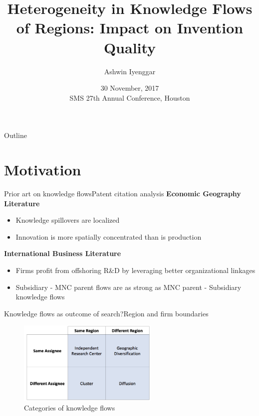 \documentclass{beamer}
\title{Heterogeneity in Knowledge Flows of Regions: Impact on Invention Quality}
\author{Ashwin Iyenggar}
\institute[Indian Institute of Management Bangalore] 
{
  Doctoral Student, Strategy Area\\
  Indian Institute of Management Bangalore
}
\date{30 November, 2017 \\ SMS 27th Annual Conference, Houston}
\begin{document}
\begin{frame}
  \titlepage
\end{frame}

\begin{frame}{Outline}
  \tableofcontents
\end{frame}


\section{Motivation}

\begin{frame}{Prior art on knowledge flows}{Patent citation analysis}
\textbf{Economic Geography Literature}
\begin{itemize}
\item{Knowledge spillovers are localized \citep*{Jaffe1993}}
\item{Innovation is more spatially concentrated than is production \citep{Feldman1994a}}
\end{itemize}

\textbf{International Business Literature}
\begin{itemize}
\item{Firms profit from offshoring R\&D by leveraging better organizational linkages \citep*{Zhao2006}}
\item{Subsidiary - MNC parent flows are as strong as MNC parent - Subsidiary knowledge flows \citep{Singh2007}}
\end{itemize}
\end{frame}

\begin{frame}{Knowledge flows as outcome of search?}{Region and firm boundaries}
\begin{figure}[h!]
\begin{centering}
  \includegraphics[width=0.6\textwidth]{2x2old}
  \caption{Categories of knowledge flows}
   \label{fig:2x2old}
\end{centering}
\end{figure}
\end{frame}
\end{document}
